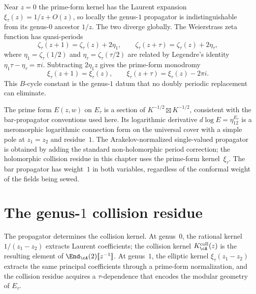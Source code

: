 Near $z = 0$ the prime-form kernel has the Laurent expansion
$\xi_\tau(z) = 1/z + O(z)$, so locally the genus-$1$ propagator
is indistinguishable from its genus-$0$ ancestor $1/z$. The two
diverge globally. The Weierstrass zeta function has quasi-periods
\begin{equation}\label{eq:g1sf-zeta-quasi}
\zeta_\tau(z + 1) = \zeta_\tau(z) + 2\eta_1,
\qquad
\zeta_\tau(z + \tau) = \zeta_\tau(z) + 2\eta_\tau,
\end{equation}
where $\eta_1 = \zeta_\tau(1/2)$ and
$\eta_\tau = \zeta_\tau(\tau/2)$ are related by Legendre's identity
$\eta_1 \tau - \eta_\tau = \pi i$. Subtracting $2\eta_1z$ gives the
prime-form monodromy
\begin{equation}\label{eq:g1sf-xi-quasi}
\xi_\tau(z+1)=\xi_\tau(z),
\qquad
\xi_\tau(z+\tau)=\xi_\tau(z)-2\pi i .
\end{equation}
This $B$-cycle constant is the genus-$1$ datum that no doubly periodic
replacement can eliminate.

\begin{remark}
\label{rem:g1sf-prime-form-conventions}
The prime form $E(z,w)$ on $E_\tau$ is a section of
$K^{-1/2} \boxtimes K^{-1/2}$, consistent with the
bar-propagator conventions used here. Its logarithmic derivative
$d\log E = \eta_{12}^{E_\tau}$ is a meromorphic logarithmic connection
form on the universal cover with a simple pole at $z_1=z_2$ and
residue~$1$. The Arakelov-normalized single-valued propagator is
obtained by adding the standard non-holomorphic period correction; the
holomorphic collision residue in this chapter uses the prime-form
kernel~$\xi_\tau$. The bar propagator has weight~$1$ in both variables,
regardless of the conformal weight of the fields being sewed.
\end{remark}



\section{The genus-$1$ collision residue}
\label{sec:g1sf-collision-residue}

The propagator determines the collision kernel. At genus~$0$, the
rational kernel $1/(z_1 - z_2)$ extracts Laurent coefficients; the
collision kernel $K_\cA^{\mathrm{coll}}(z)$ is the resulting element of
$\End_\cA(2)[\![z^{-1}]\!]$. At genus~$1$, the elliptic kernel
$\xi_\tau(z_1 - z_2)$ extracts the same principal coefficients through
a prime-form normalization, and the collision residue acquires a
$\tau$-dependence that encodes the modular geometry of $E_\tau$.

